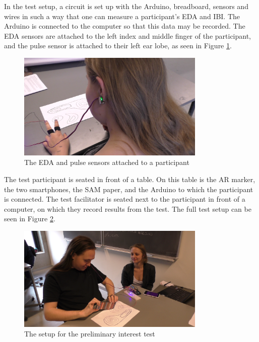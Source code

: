 In the test setup, a circuit is set up with the Arduino, breadboard, sensors and wires in such a way that one can measure a participant’s EDA and IBI. The Arduino is connected to the computer so that this data may be recorded. The EDA sensors are attached to the left index and middle finger of the participant, and the pulse sensor is attached to their left ear lobe, as seen in Figure \ref{fig:pretest_ear}.

\begin{figure}[h!]
    \centering
    \includegraphics[width=0.8\textwidth]{figures/pretest_ear.png}
    \caption{The EDA and pulse sensors attached to a participant}\label{fig:pretest_ear}
\end{figure}

The test participant is seated in front of a table. On this table is the AR marker, the two smartphones, the SAM paper, and the Arduino to which the participant is connected. The test facilitator is seated next to the participant in front of a computer, on which they record results from the test. The full test setup can be seen in Figure \ref{fig:pretest_setup}.

\begin{figure}[h!]
    \centering
    \includegraphics[width=0.8\textwidth]{figures/pretest_setup.png}
    \caption{The setup for the preliminary interest test}\label{fig:pretest_setup}
\end{figure}

